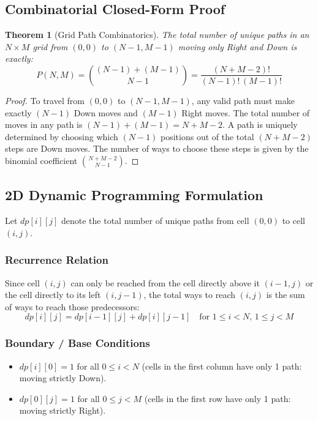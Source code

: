 \documentclass[10pt,journal,compsoc,onecolumn]{IEEEtran}
\newtheorem{theorem}{Theorem}
\begin{document}
\subsection{Combinatorial Closed-Form Proof}

\begin{theorem}[Grid Path Combinatorics]
The total number of unique paths in an $N \times M$ grid from $(0,0)$ to $(N-1, M-1)$ moving only Right and Down is exactly:
\begin{equation}
P(N,M) = \binom{(N-1) + (M-1)}{N-1} = \frac{(N + M - 2)!}{(N - 1)! \, (M - 1)!}
\label{eq:grid-paths-combinatorial}
\end{equation}
\end{theorem}

\begin{proof}
To travel from $(0,0)$ to $(N-1, M-1)$, any valid path must make exactly $(N-1)$ Down moves and $(M-1)$ Right moves. The total number of moves in any path is $(N-1) + (M-1) = N + M - 2$. A path is uniquely determined by choosing which $(N-1)$ positions out of the total $(N+M-2)$ steps are Down moves. The number of ways to choose these steps is given by the binomial coefficient $\binom{N+M-2}{N-1}$.
\end{proof}

\subsection{2D Dynamic Programming Formulation}

Let $dp[i][j]$ denote the total number of unique paths from cell $(0,0)$ to cell $(i,j)$.

\subsubsection{Recurrence Relation}
Since cell $(i,j)$ can only be reached from the cell directly above it $(i-1, j)$ or the cell directly to its left $(i, j-1)$, the total ways to reach $(i,j)$ is the sum of ways to reach those predecessors:
\begin{equation}
dp[i][j] = dp[i-1][j] + dp[i][j-1] \quad \text{for } 1 \le i < N, \, 1 \le j < M
\label{eq:unique-paths-rec}
\end{equation}

\subsubsection{Boundary / Base Conditions}
\begin{itemize}
    \item $dp[i][0] = 1$ for all $0 \le i < N$ (cells in the first column have only 1 path: moving strictly Down).
    \item $dp[0][j] = 1$ for all $0 \le j < M$ (cells in the first row have only 1 path: moving strictly Right).
\end{itemize}
\end{document}
